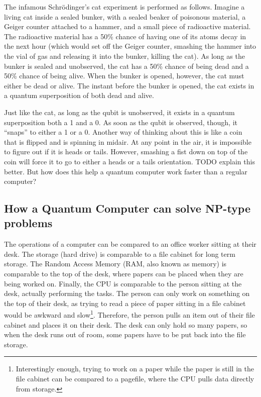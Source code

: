 \documentclass[10pt,journal,compsoc]{IEEEtran}
\begin{document}
The infamous Schr\"{o}dinger's cat experiment is performed as follows. Imagine a living cat inside a sealed bunker, with a sealed beaker of poisonous material, a Geiger counter attached to a hammer, and a small piece of radioactive material. The radioactive material has a 50\% chance of having one of its atoms decay in the next hour (which would set off the Geiger counter, smashing the hammer into the vial of gas and releasing it into the bunker, killing the cat). As long as the bunker is sealed and unobserved, the cat has a 50\% chance of being dead and a 50\% chance of being alive. When the bunker is opened, however, the cat must either be dead or alive. The instant before the bunker is opened, the cat exists in a quantum superposition of both dead and alive. 

Just like the cat, as long as the qubit is unobserved, it exists in a quantum superposition both a 1 and a 0. As soon as the qubit is observed, though, it ``snaps'' to either a 1 or a 0. Another way of thinking about this is like a coin that is flipped and is  spinning in midair. At any point in the air, it is impossible to figure out if it is heads or tails. However, smashing a fist down on top of the coin will force it to go to either a heads or a tails orientation. TODO explain this better. But how does this help a quantum computer work faster than a regular computer?







\subsection{How a Quantum Computer can solve NP-type problems}

The operations of a computer can be compared to an office worker sitting at their desk. The storage (hard drive) is comparable to a file cabinet for long term storage. The Random Access Memory (RAM, also known as memory) is comparable to the top of the desk, where papers can be placed when they are being worked on. Finally, the CPU is comparable to the person sitting at the desk, actually performing the tasks. The person can only work on something on the top of their desk, as trying to read a piece of paper sitting in a file cabinet would be awkward and slow\footnote{Interestingly enough, trying to work on a paper while the paper is still in the file cabinet can be compared to a pagefile, where the CPU pulls data directly from storage.}. Therefore, the person pulls an item out of their file cabinet and places it on their desk. The desk can only hold so many papers, so when the desk runs out of room, some papers have to be put back into the file storage. 
\end{document}
